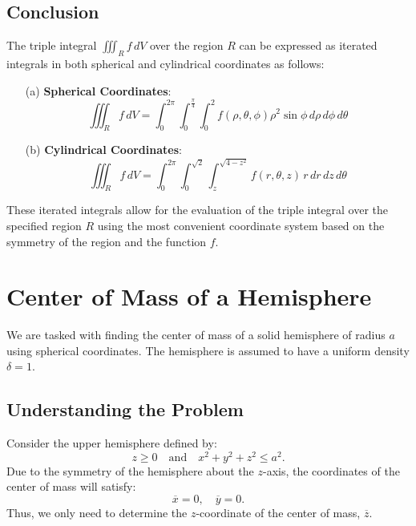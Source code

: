\documentclass[11pt]{article}
\begin{document}
\subsection{Conclusion}

The triple integral \( \iiint_{R} f \, dV \) over the region \( R \) can be expressed as iterated integrals in both spherical and cylindrical coordinates as follows:

\begin{enumerate}
    \item[(a)] \textbf{Spherical Coordinates}:
    \[
    \iiint_{R} f \, dV = \int_{0}^{2\pi} \int_{0}^{\frac{\pi}{4}} \int_{0}^{2} f(\rho, \theta, \phi) \rho^2 \sin\phi \, d\rho \, d\phi \, d\theta
    \]

    \item[(b)] \textbf{Cylindrical Coordinates}:
    \[
    \iiint_{R} f \, dV = \int_{0}^{2\pi} \int_{0}^{\sqrt{2}} \int_{z}^{\sqrt{4 - z^2}} f(r, \theta, z) \, r \, dr \, dz \, d\theta
    \]
\end{enumerate}

These iterated integrals allow for the evaluation of the triple integral over the specified region \( R \) using the most convenient coordinate system based on the symmetry of the region and the function \( f \).




\newpage

\section{Center of Mass of a Hemisphere}

We are tasked with finding the center of mass of a solid hemisphere of radius \( a \) using spherical coordinates. The hemisphere is assumed to have a uniform density \( \delta = 1 \).

\newpage

\subsection{Understanding the Problem}

Consider the upper hemisphere defined by:
\[
z \geq 0 \quad \text{and} \quad x^2 + y^2 + z^2 \leq a^2.
\]
Due to the symmetry of the hemisphere about the \( z \)-axis, the coordinates of the center of mass will satisfy:
\[
\overline{x} = 0, \quad \overline{y} = 0.
\]
Thus, we only need to determine the \( z \)-coordinate of the center of mass, \( \overline{z} \).
\end{document}
